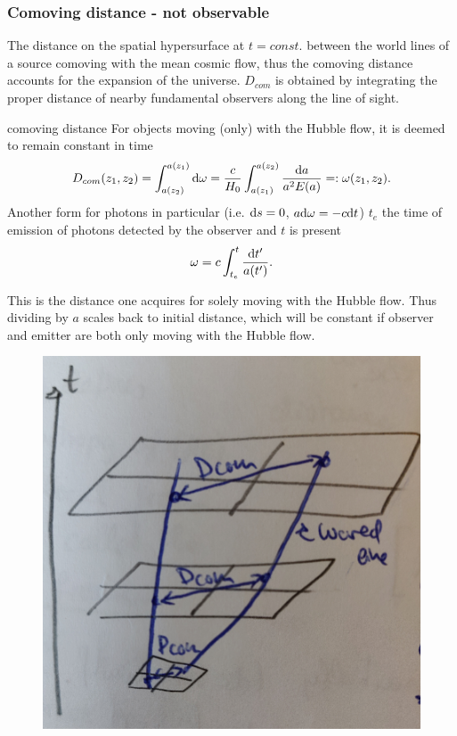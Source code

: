 \subsubsection{Comoving distance - not observable}
The distance on the spatial hypersurface at $t=const.$ between the world lines of a source comoving with the mean cosmic flow, thus the comoving distance accounts for the expansion of the universe. $D_{com}$ is obtained by integrating the proper distance of nearby fundamental observers along the line of sight.
\begin{mybox}{comoving distance}
	For objects moving (only) with the Hubble flow, it is deemed to remain constant in time
	\begin{equation}
		D_{com}(z_1,z_2) = \int_{a(z_2)}^{a(z_1)} \mathrm{d} \omega= \frac{c}{H_0} \int_{a(z_1)}^{a(z_2)} \frac{\mathrm{d} a}{a^2 E(a)} =: \omega(z_1,z_2).
	\end{equation}
	Another form for photons in particular (i.e. $\mathrm{d} s=0$, $a \mathrm{d}\omega=-c \mathrm{d} t$) $t_e$ the time of emission of photons detected by the observer and $t$ is present
	\begin{equation}
	\omega=	c \int_{t_e}^t \frac{\mathrm{d} t^\prime}{a(t^\prime)}.
	\end{equation}
\end{mybox}
This is the distance one acquires for solely moving with the Hubble flow. Thus dividing by $a$ scales back to initial distance, which will be constant if observer and emitter are both only moving with the Hubble flow.

\begin{figure}[h!]
	\centering
	\includegraphics[width=0.7\linewidth]{gfx/comovingdistance}
	\caption{}
	\label{fig:comovingdistance}
\end{figure}





